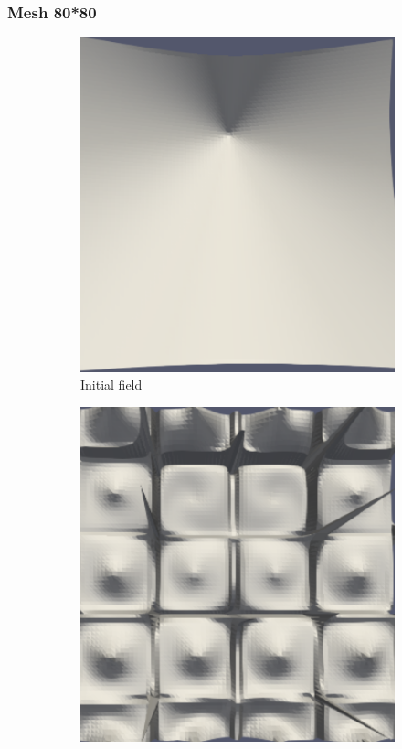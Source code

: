 \documentclass{article}
\begin{document}
\subsubsection{Mesh 80*80}
\begin{figure}[hbt!]
  \begin{subfigure}{0.4\textwidth}
        \centering
        \includegraphics[width=\textwidth]{Figures/5e-5 80x80/for n 1.png}
        \caption{Initial field}
  \end{subfigure}
  \hfill
  \begin{subfigure}{0.4\textwidth}
        \centering
        \includegraphics[width=\textwidth]{Figures/5e-5 80x80/for n 20.png}

\end{subfigure}
\end{figure}
\end{document}

